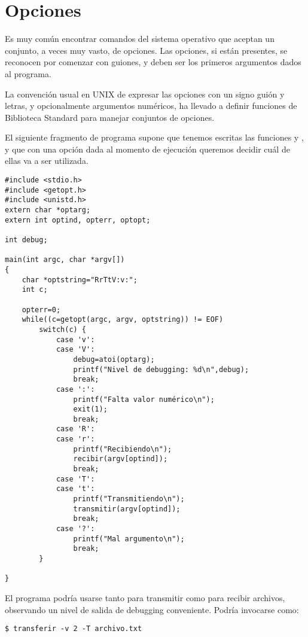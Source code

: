 \section{Opciones}
Es muy común encontrar comandos del sistema operativo que aceptan un conjunto,
a veces muy vasto, de opciones. Las opciones, si están presentes, se reconocen
por comenzar con guiones, y deben ser los primeros argumentos dados al
programa.

La convención usual en UNIX de expresar las opciones con un signo guión y
letras, y opcionalmente argumentos numéricos, ha llevado a definir funciones de
Biblioteca Standard para manejar conjuntos de opciones.

\begin{ejemplo}
El siguiente fragmento de programa supone que tenemos escritas las funciones  y , y que con una opción dada al momento de ejecución queremos decidir cuál de ellas va a ser utilizada.
\begin{lstlisting}
#include <stdio.h>
#include <getopt.h>
#include <unistd.h>
extern char *optarg;
extern int optind, opterr, optopt;

int debug;

main(int argc, char *argv[])
{
    char *optstring="RrTtV:v:";
    int c;

    opterr=0;
    while((c=getopt(argc, argv, optstring)) != EOF)
        switch(c) {
            case 'v':
            case 'V':
                debug=atoi(optarg);
                printf("Nivel de debugging: %d\n",debug);
                break;
            case ':':
                printf("Falta valor numérico\n");
                exit(1);
                break;
            case 'R':
            case 'r':
                printf("Recibiendo\n");
                recibir(argv[optind]);
                break;
            case 'T':
            case 't':
                printf("Transmitiendo\n");
                transmitir(argv[optind]);
                break;
            case '?':
                printf("Mal argumento\n");
                break;
        }

}	
\end{lstlisting}

El programa podría usarse tanto para transmitir como para recibir archivos,
observando un nivel de salida de debugging conveniente. Podría invocarse como:

\begin{lstlisting}
$ transferir -v 2 -T archivo.txt
\end{lstlisting}
\end{ejemplo}

